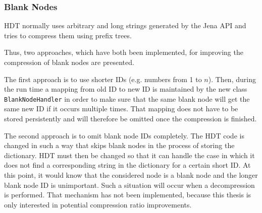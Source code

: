 \subsubsection{Blank Nodes}\label{sec:implementationBlankNodes}

HDT normally uses arbitrary and long strings generated by the Jena API and tries to compress them using prefix trees.

Thus, two approaches, which have both been implemented, for improving the compression of blank nodes are presented.

The first approach is to use shorter IDs (e.g. numbers from 1 to $n$). Then, during the run time a mapping from old ID to new ID is maintained by the new class {\tt BlankNodeHandler} in order to make sure that the same blank node will get the same new ID if it occurs multiple times. That mapping does not have to be stored persistently and will therefore be omitted once the compression is finished.

The second approach is to omit blank node IDs completely. The HDT code is changed in such a way that skips blank nodes in the process of storing the dictionary. HDT must then be changed so that it can handle the case in which it does not find a corresponding string in the dictionary for a certain short ID. At this point, it would know that the considered node is a blank node and the longer blank node ID is unimportant. Such a situation will occur when a decompression is performed. That mechanism has not been implemented, because this thesis is only interested in potential compression ratio improvements.

















